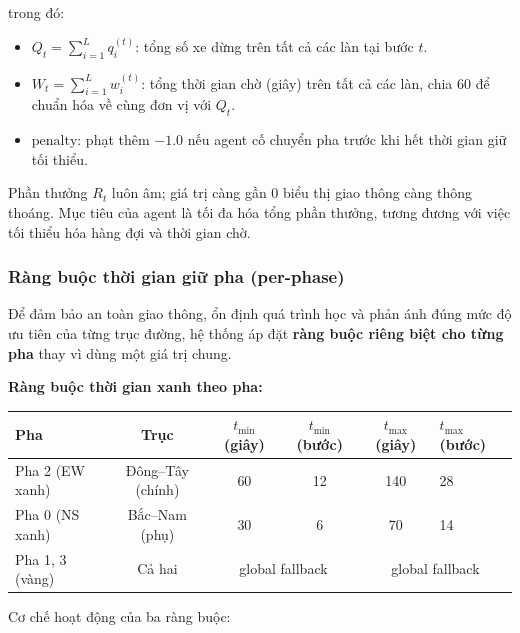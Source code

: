 trong đó:
\begin{itemize}
    \item $Q_t = \sum_{i=1}^{L} q_i^{(t)}$: tổng số xe dừng trên tất cả các làn tại bước $t$.
    \item $W_t = \sum_{i=1}^{L} w_i^{(t)}$: tổng thời gian chờ (giây) trên tất cả các làn, chia 60 để chuẩn hóa về cùng đơn vị với $Q_t$.
    \item $\text{penalty}$: phạt thêm $-1.0$ nếu agent cố chuyển pha trước khi hết thời gian giữ tối thiểu.
\end{itemize}

Phần thưởng $R_t$ luôn âm; giá trị càng gần 0 biểu thị giao thông càng thông thoáng. Mục tiêu của agent là tối đa hóa tổng phần thưởng, tương đương với việc tối thiểu hóa hàng đợi và thời gian chờ.

\subsubsection{Ràng buộc thời gian giữ pha (per-phase)}

Để đảm bảo an toàn giao thông, ổn định quá trình học và phản ánh đúng mức độ ưu tiên của từng trục đường, hệ thống áp đặt \textbf{ràng buộc riêng biệt cho từng pha} thay vì dùng một giá trị chung.

\vspace{6pt}
\textbf{Ràng buộc thời gian xanh theo pha:}

\begin{center}
\begin{tabular}{|l|c|c|c|c|l|}
\hline
\textbf{Pha} & \textbf{Trục} & $t_{\min}$ \textbf{(giây)} & $t_{\min}$ \textbf{(bước)} & $t_{\max}$ \textbf{(giây)} & $t_{\max}$ \textbf{(bước)} \\
\hline
Pha 2 (EW xanh) & Đông--Tây (chính) & 60 & 12 & 140 & 28 \\
Pha 0 (NS xanh) & Bắc--Nam (phụ) & 30 & 6 & 70 & 14 \\
Pha 1, 3 (vàng) & Cả hai & \multicolumn{2}{c|}{global fallback} & \multicolumn{2}{c|}{global fallback} \\
\hline
\end{tabular}
\end{center}

\vspace{6pt}
Cơ chế hoạt động của ba ràng buộc:

